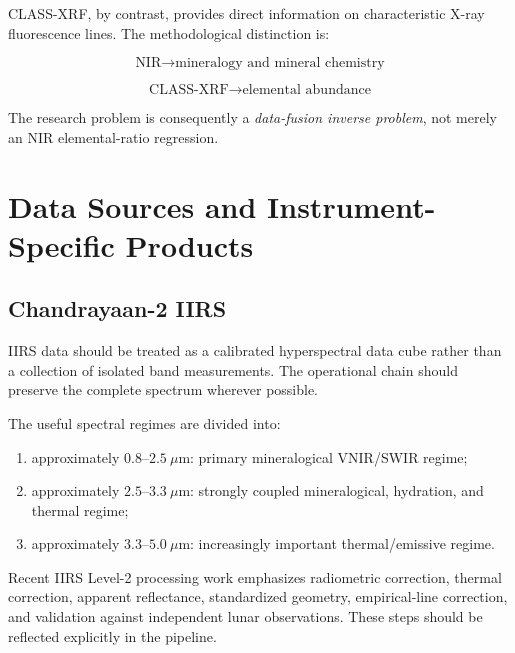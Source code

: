 \documentclass[11pt,a4paper]{article}
\begin{document}
CLASS-XRF, by contrast, provides direct information on characteristic X-ray fluorescence lines. The methodological distinction is:

\begin{equation}
\boxed{
\text{NIR} \rightarrow \text{mineralogy and mineral chemistry}
}
\end{equation}

\begin{equation}
\boxed{
\text{CLASS-XRF} \rightarrow \text{elemental abundance}
}
\end{equation}

The research problem is consequently a \emph{data-fusion inverse problem}, not merely an NIR elemental-ratio regression.

\section{Data Sources and Instrument-Specific Products}

\subsection{Chandrayaan-2 IIRS}

IIRS data should be treated as a calibrated hyperspectral data cube rather than a collection of isolated band measurements. The operational chain should preserve the complete spectrum wherever possible.

The useful spectral regimes are divided into:

\begin{enumerate}[label=\alph*.]
    \item approximately $0.8$--$2.5~\mu$m: primary mineralogical VNIR/SWIR regime;
    \item approximately $2.5$--$3.3~\mu$m: strongly coupled mineralogical, hydration, and thermal regime;
    \item approximately $3.3$--$5.0~\mu$m: increasingly important thermal/emissive regime.
\end{enumerate}

Recent IIRS Level-2 processing work emphasizes radiometric correction, thermal correction, apparent reflectance, standardized geometry, empirical-line correction, and validation against independent lunar observations. These steps should be reflected explicitly in the pipeline.
\end{document}

